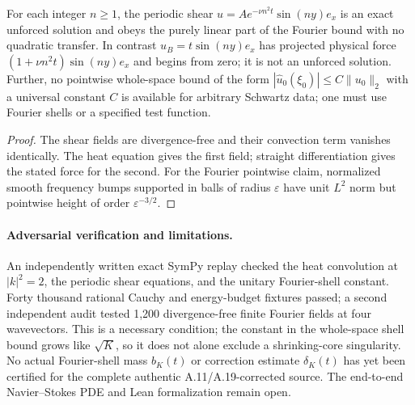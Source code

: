 \begin{proposition}
\label{prop:xxx-controls}
For each integer $n\ge1$, the periodic shear
$u=Ae^{-\nu n^2t}\sin(ny)e_x$ is an exact unforced
solution and obeys the purely linear part of the Fourier bound
with no quadratic transfer. In contrast
$u_B=t\sin(ny)e_x$ has projected physical force
$(1+\nu n^2t)\sin(ny)e_x$ and begins from zero; it is not an
unforced solution. Further, no pointwise whole-space bound of the
form $|\widehat u_0(\xi_0)|\le C\|u_0\|_2$ with a universal
constant $C$ is available for arbitrary Schwartz data; one must
use Fourier shells or a specified test function.
\end{proposition}
\begin{proof}
The shear fields are divergence-free and their convection term
vanishes identically. The heat equation gives the first field;
straight differentiation gives the stated force for the second.
For the Fourier pointwise claim, normalized smooth frequency bumps
supported in balls of radius $\varepsilon$ have unit $L^2$
norm but pointwise height of order $\varepsilon^{-3/2}$.
\end{proof}

\paragraph{Adversarial verification and limitations.}
An independently written exact SymPy replay checked the heat
convolution at $|k|^2=2$, the periodic shear equations, and the
unitary Fourier-shell constant. Forty thousand rational Cauchy
and energy-budget fixtures passed; a second independent audit
tested 1,200 divergence-free finite Fourier fields at four
wavevectors. This is a necessary condition; the constant in the
whole-space shell bound grows like $\sqrt K$, so it does not alone
exclude a shrinking-core singularity. No actual Fourier-shell
mass $b_K(t)$ or correction estimate $\delta_K(t)$ has yet been
certified for the complete authentic A.11/A.19-corrected source.
The end-to-end Navier--Stokes PDE and Lean formalization remain open.
